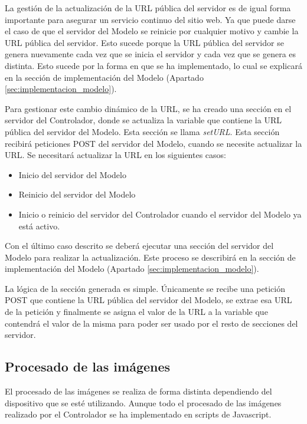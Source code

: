 La gestión de la actualización de la URL pública del servidor es de igual forma importante para asegurar un servicio continuo del sitio web. Ya que puede darse el caso de que el servidor del Modelo se reinicie por cualquier motivo y cambie la URL pública del servidor. Esto sucede porque la URL pública del servidor se genera nuevamente cada vez que se inicia el servidor y cada vez que se genera es distinta. Esto sucede por la forma en que se ha implementado, lo cual se explicará en la sección de implementación del Modelo (Apartado \ref{sec:implementacion_modelo}).

Para gestionar este cambio dinámico de la URL, se ha creado una sección en el servidor del Controlador, donde se actualiza la variable que contiene la URL pública del servidor del Modelo. Esta sección se llama \textit{setURL}. Esta sección recibirá peticiones POST del servidor del Modelo, cuando se necesite actualizar la URL. Se necesitará actualizar la URL en los siguientes casos:

\begin{itemize}
\item Inicio del servidor del Modelo
\item Reinicio del servidor del Modelo
\item Inicio o reinicio del servidor del Controlador cuando el servidor del Modelo ya está activo.
\end{itemize}

Con el último caso descrito se deberá ejecutar una sección del servidor del Modelo para realizar la actualización. Este proceso se describirá en la sección de implementación del Modelo (Apartado \ref{sec:implementacion_modelo}).

La lógica de la sección generada es simple. Únicamente se recibe una petición POST que contiene la URL pública del servidor del Modelo, se extrae esa URL de la petición y finalmente se asigna el valor de la URL a la variable que contendrá el valor de la misma para poder ser usado por el resto de secciones del servidor.


\subsection{Procesado de las imágenes}

El procesado de las imágenes se realiza de forma distinta dependiendo del dispositivo que se esté utilizando. Aunque todo el procesado de las imágenes realizado por el Controlador se ha implementado en scripts de Javascript.

